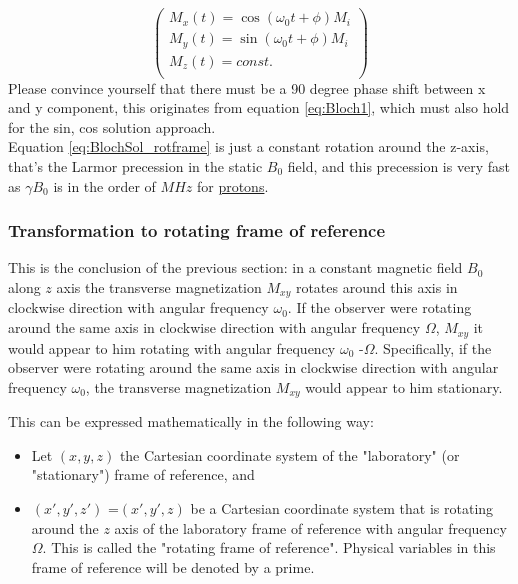 \documentclass[a4paper,12pt]{extarticle}
\begin{document}
\begin{equation} \label{eq:BlochSol_rotframe}
\begin{pmatrix}
M_x(t)  = \cos (\omega_0 t+\phi) M_i \\
 M_y(t)  = \sin (\omega_0 t+\phi) M_i   \\
 M_z(t)  = const. \\
\end{pmatrix}
\end{equation}Please convince yourself that there must be a 90 degree phase shift between x and y component, this originates from equation \eqref{eq:Bloch1}, which must also hold for the sin, cos solution approach.
\\
Equation \eqref{eq:BlochSol_rotframe} is just a constant rotation around the z-axis, that's the Larmor precession in the static $B_0$ field, and this precession is very fast as $\gamma B_0$ is in the order of $MHz$ for \href{https://en.wikipedia.org/wiki/Gyromagnetic_ratio}{protons}. 
 
\subsubsection{Transformation to rotating frame of reference}
This is the conclusion of the previous section: in a constant magnetic field $B_0$ along $z$ axis the transverse magnetization $M_{xy}$ rotates around this axis in clockwise direction with angular frequency $\omega_0$. If the observer were rotating around the same axis in  clockwise direction with angular frequency  $\Omega$, $M_{xy}$ it would appear to him  rotating with angular frequency  $\omega_0$ -$\Omega$. Specifically, if the observer were rotating around the same axis in
clockwise direction with angular frequency $\omega_0$, the transverse magnetization $M_{xy}$ would appear to him stationary.

This can be expressed mathematically in the following way:
\begin{itemize}
\item Let $(x, y, z)$ the Cartesian coordinate system of the "laboratory" (or "stationary") frame of reference, and
\item $(x', y', z')$ =$(x', y', z)$  be a Cartesian coordinate system that is rotating around the $z$ axis of the laboratory frame of reference with angular frequency $\Omega$. This is called the "rotating frame of reference". Physical variables in this frame of reference will be denoted by a prime.
\end{itemize}
\end{document}
